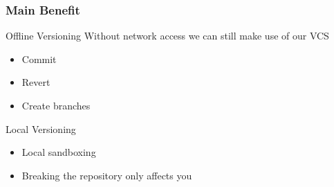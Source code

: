 \begin{frame}
	\frametitle{Main Benefit}
	\begin{block}{Offline Versioning}
		Without network access we can still make use of our VCS
		\begin{itemize}
			\item Commit
			\item Revert
			\item Create branches
		\end{itemize}
	\end{block}
	\begin{block}{Local Versioning}
		\begin{itemize}
			\item Local sandboxing
			\item Breaking the repository only affects you
		\end{itemize}
	\end{block}
\end{frame}
